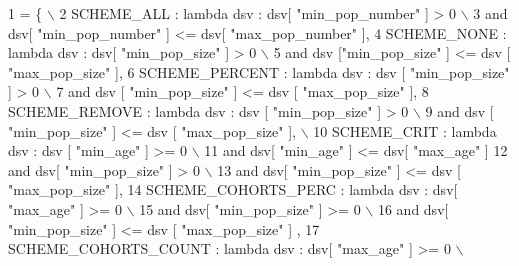 \begin{DoxyCode}
1 = \{ \(\backslash\)
2                     SCHEME\_ALL : \textcolor{keyword}{lambda} dsv : dsv[ \textcolor{stringliteral}{"min\_pop\_number"} ] > 0  \(\backslash\)
3                                         \textcolor{keywordflow}{and} dsv[ \textcolor{stringliteral}{"min\_pop\_number"} ] <= dsv[ \textcolor{stringliteral}{"max\_pop\_number"} ],
4                     SCHEME\_NONE : \textcolor{keyword}{lambda} dsv : dsv[ \textcolor{stringliteral}{"min\_pop\_size"} ] > 0 \(\backslash\)
5                                         \textcolor{keywordflow}{and} dsv [\textcolor{stringliteral}{"min\_pop\_size"} ] <= dsv [ \textcolor{stringliteral}{"max\_pop\_size"} ],
6                     SCHEME\_PERCENT : \textcolor{keyword}{lambda} dsv : dsv [ \textcolor{stringliteral}{"min\_pop\_size"} ] > 0 \(\backslash\)
7                                         \textcolor{keywordflow}{and} dsv [ \textcolor{stringliteral}{"min\_pop\_size"} ] <= dsv [ \textcolor{stringliteral}{"max\_pop\_size"} ],                   
8                     SCHEME\_REMOVE : \textcolor{keyword}{lambda} dsv : dsv [ \textcolor{stringliteral}{"min\_pop\_size"} ] > 0 \(\backslash\)
9                                         \textcolor{keywordflow}{and} dsv [ \textcolor{stringliteral}{"min\_pop\_size"} ] <= dsv [ \textcolor{stringliteral}{"max\_pop\_size"} ], \(\backslash\)
10                     SCHEME\_CRIT :  \textcolor{keyword}{lambda} dsv : dsv [ \textcolor{stringliteral}{"min\_age"} ] >= 0  \(\backslash\)
11                                         \textcolor{keywordflow}{and} dsv[ \textcolor{stringliteral}{"min\_age"} ] <= dsv[ \textcolor{stringliteral}{"max\_age"} ]
12                                         \textcolor{keywordflow}{and} dsv[ \textcolor{stringliteral}{"min\_pop\_size"} ] > 0 \(\backslash\)
13                                         \textcolor{keywordflow}{and} dsv[ \textcolor{stringliteral}{"min\_pop\_size"} ] <= dsv [ \textcolor{stringliteral}{"max\_pop\_size"} ],                    
14                     SCHEME\_COHORTS\_PERC : \textcolor{keyword}{lambda} dsv : dsv[ \textcolor{stringliteral}{"max\_age"} ] >= 0  \(\backslash\)
15                                         \textcolor{keywordflow}{and} dsv[ \textcolor{stringliteral}{"min\_pop\_size"} ] >= 0 \(\backslash\)
16                                         \textcolor{keywordflow}{and} dsv[ \textcolor{stringliteral}{"min\_pop\_size"} ] <= dsv [ \textcolor{stringliteral}{"max\_pop\_size"} ] ,
17                     SCHEME\_COHORTS\_COUNT : \textcolor{keyword}{lambda} dsv : dsv[ \textcolor{stringliteral}{"max\_age"} ] >= 0  \(\backslash\)

\end{DoxyCode}
